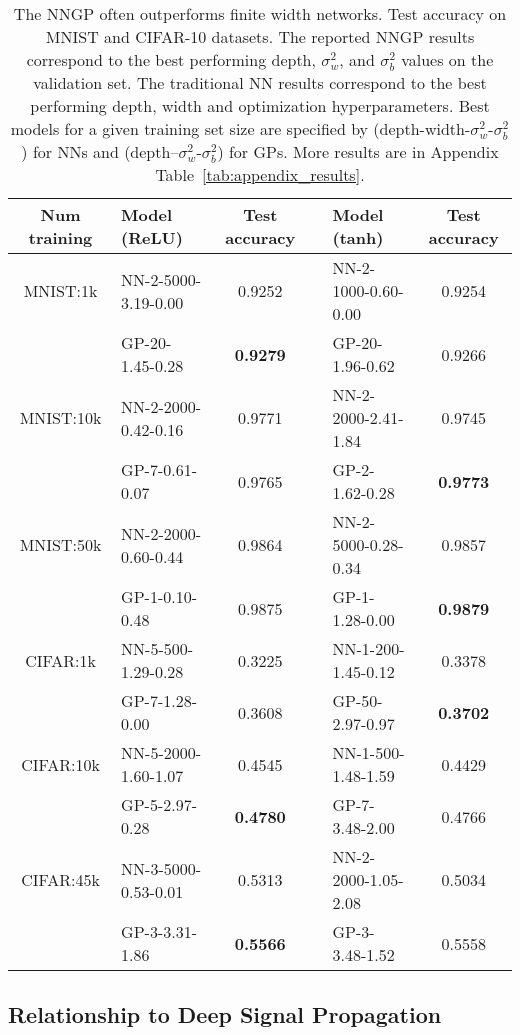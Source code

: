 \documentclass{article} %
\begin{document}
\begin{table}[htp]
  \caption{The NNGP often outperforms finite width networks. Test accuracy on MNIST and CIFAR-10 datasets. 
  The reported NNGP results correspond to the best performing depth, $\sigma_w^2$, and $\sigma_b^2$ values on the validation set. The traditional NN results correspond to the best performing depth, width and optimization hyperparameters. Best models for a given training set size are specified by (depth-width-$\sigma_w^2$-$\sigma_b^2$) for NNs and (depth--$\sigma_w^2$-$\sigma_b^2$) for GPs. More results are in Appendix Table~\ref{tab:appendix_results}.}\label{tab:performance}
  \centering
  \begin{tabular}{c|lc|clc}
  \hline
    Num training     & Model (ReLU)    & Test accuracy && Model (tanh)   & Test accuracy \\
    \hline 
    \hline 
    MNIST:1k & NN-2-5000-3.19-0.00 &0.9252&& NN-2-1000-0.60-0.00 &0.9254\\ 
    & GP-20-1.45-0.28& \bf{ 0.9279 }&& GP-20-1.96-0.62& 0.9266\\ 
    \hline 
    MNIST:10k & NN-2-2000-0.42-0.16 &0.9771&& NN-2-2000-2.41-1.84 &0.9745\\ 
    & GP-7-0.61-0.07& 0.9765&& GP-2-1.62-0.28& \bf{ 0.9773 }\\ 
    \hline 
    MNIST:50k & NN-2-2000-0.60-0.44 &0.9864&& NN-2-5000-0.28-0.34 &0.9857\\ 
    & GP-1-0.10-0.48& 0.9875&& GP-1-1.28-0.00& \bf{ 0.9879 }\\ 
    \hline 
    \hline 
    CIFAR:1k & NN-5-500-1.29-0.28 &0.3225&& NN-1-200-1.45-0.12 &0.3378\\ 
    & GP-7-1.28-0.00& 0.3608&& GP-50-2.97-0.97& \bf{ 0.3702 }\\ 
    \hline 
    CIFAR:10k & NN-5-2000-1.60-1.07 &0.4545&& NN-1-500-1.48-1.59 &0.4429\\ 
    & GP-5-2.97-0.28& \bf{ 0.4780 }&& GP-7-3.48-2.00& 0.4766\\ 
    \hline 
    CIFAR:45k & NN-3-5000-0.53-0.01 &0.5313&& NN-2-2000-1.05-2.08 &0.5034\\ 
    & GP-3-3.31-1.86& \bf{ 0.5566 }&& GP-3-3.48-1.52& 0.5558\\
    \hline
  \end{tabular}
\end{table}



\subsection{Relationship to Deep Signal Propagation}
\label{sec:deepinfo}
\end{document}
